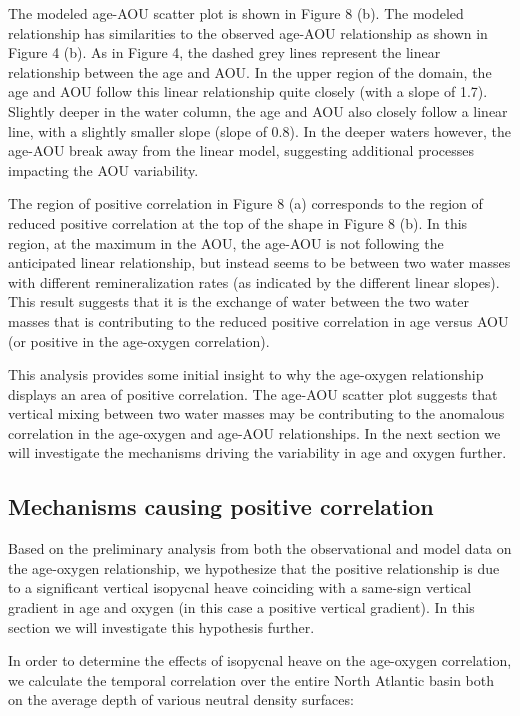\documentclass{ametsoc}
\begin{document}
The modeled age-AOU scatter plot is shown in Figure 8 (b). The modeled relationship has similarities to the observed age-AOU relationship as shown in Figure 4 (b). As in Figure 4, the dashed grey lines represent the linear relationship between the age and AOU. In the upper region of the domain, the age and AOU follow this linear relationship quite closely (with a slope of 1.7). Slightly deeper in the water column, the age and AOU also closely follow a linear line, with a slightly smaller slope (slope of 0.8). In the deeper waters however, the age-AOU break away from the linear model, suggesting additional processes impacting the AOU variability.

The region of positive correlation in Figure 8 (a) corresponds to the region of reduced positive correlation at the top of the shape in Figure 8 (b). In this region, at the maximum in the AOU, the age-AOU is not following the anticipated linear relationship, but instead seems to be between two water masses with different remineralization rates (as indicated by the different linear slopes). This result suggests that it is the exchange of water between the two water masses that is contributing to the reduced positive correlation in age versus AOU (or positive in the age-oxygen correlation).

This analysis provides some initial insight to why the age-oxygen relationship displays an area of positive correlation. The age-AOU scatter plot suggests that vertical mixing between two water masses may be contributing to the anomalous correlation in the age-oxygen and age-AOU relationships. In the next section we will investigate the mechanisms driving the variability in age and oxygen further.

\subsection{Mechanisms causing positive correlation}

Based on the preliminary analysis from both the observational and model data on the age-oxygen relationship, we hypothesize that the positive relationship is due to a significant vertical isopycnal heave coinciding with a same-sign vertical gradient in age and oxygen (in this case a positive vertical gradient). In this section we will investigate this hypothesis further.

In order to determine the effects of isopycnal heave on the age-oxygen correlation, we calculate the temporal correlation over the entire North Atlantic basin both on the average depth of various neutral density surfaces:
\end{document}
